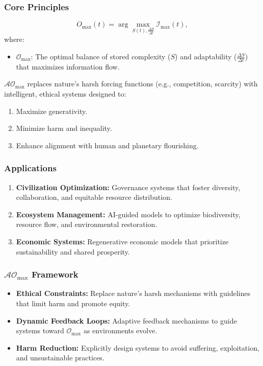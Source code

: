 \documentclass[12pt]{article}
\begin{document}
\subsubsection{Core Principles}
\[
O_{\text{max}}(t) = \arg \max_{S(t), \frac{\Delta S}{\Delta t}} \mathcal{I}_{\text{max}}(t),
\]
where:
\begin{itemize}
    \item \( \mathcal{O}_{\text{max}} \): The optimal balance of stored complexity (\( S \)) and adaptability (\( \frac{\Delta S}{\Delta t} \)) that maximizes information flow.
\end{itemize}

\( \mathcal{AO}_{\text{max}} \) replaces nature’s harsh forcing functions (e.g., competition, scarcity) with intelligent, ethical systems designed to:
\begin{enumerate}
    \item Maximize generativity.
    \item Minimize harm and inequality.
    \item Enhance alignment with human and planetary flourishing.
\end{enumerate}

\subsubsection{Applications}
\begin{enumerate}
    \item \textbf{Civilization Optimization:} Governance systems that foster diversity, collaboration, and equitable resource distribution.
    \item \textbf{Ecosystem Management:} AI-guided models to optimize biodiversity, resource flow, and environmental restoration.
    \item \textbf{Economic Systems:} Regenerative economic models that prioritize sustainability and shared prosperity.
\end{enumerate}

\subsubsection{\( \mathcal{AO}_{\text{max}} \) Framework}
\begin{itemize}
    \item \textbf{Ethical Constraints:} Replace nature’s harsh mechanisms with guidelines that limit harm and promote equity.
    \item \textbf{Dynamic Feedback Loops:} Adaptive feedback mechanisms to guide systems toward \( \mathcal{O}_{\text{max}} \) as environments evolve.
    \item \textbf{Harm Reduction:} Explicitly design systems to avoid suffering, exploitation, and unsustainable practices.
\end{itemize}
\end{document}
